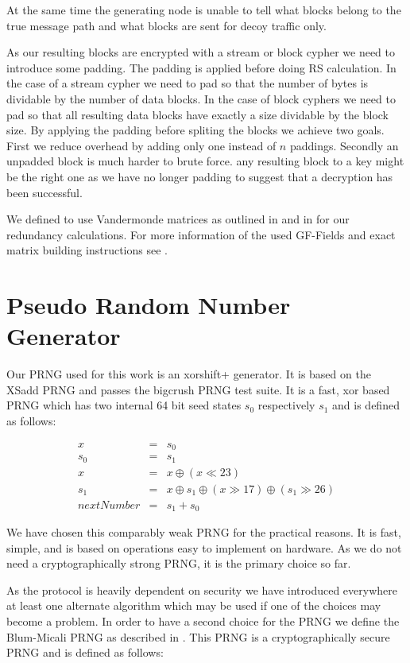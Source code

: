 \documentclass[9pt,journal,compsoc]{IEEEtran}
\begin{document}
At the same time the generating node is unable to tell what blocks belong to the true message path and what blocks are sent for decoy traffic only. 

As our resulting blocks are encrypted with a stream or block cypher we need to introduce some padding. The padding is applied before doing RS calculation. In the case of a stream cypher we need to pad so that the number of bytes is dividable by the number of data blocks. In the case of block cyphers we need to pad so that all resulting data blocks have exactly a size dividable by the block size. By applying the padding before spliting the blocks we achieve two goals. First we reduce overhead by adding only one instead of $n$ paddings. Secondly an unpadded block is much harder to brute force. any resulting block to a key might be the right one as we have no longer padding to suggest that a decryption has been successful.

We defined to use Vandermonde matrices as outlined in \cite{pd:96:rs} and in \cite{pd:03:rs} for our redundancy calculations. For more information of the used GF-Fields and exact matrix building instructions see \cite{messageVortex}.

\section{Pseudo Random Number Generator\label{sec:prng}}
Our PRNG used for this work is an xorshift+ generator. It is based on the XSadd PRNG\cite{marsaglia2003xorshift} and passes the bigcrush PRNG test suite. It is a fast, xor based PRNG which has two internal 64 bit seed states $s_0$ respectively $s_1$ and is defined as follows:

\begin{eqnarray}
x & = & s_0\\
s_0 & = & s_1\\
x & = & x \oplus ( x \ll 23 )\\
s_1 & = & x \oplus s_1 \oplus ( x \gg 17 ) \oplus (s_1 \gg 26 )\\
nextNumber & = & s_1+s_0
\end{eqnarray}

We have chosen this comparably weak PRNG for the practical reasons. It is fast, simple, and is based on operations easy to implement on hardware. As we do not need a cryptographically strong PRNG, it is the primary choice so far. 

As the protocol is heavily dependent on security we have introduced everywhere at least one alternate algorithm which may be used if one of the choices may become a problem. In order to have a second choice for the PRNG we define the Blum-Micali PRNG as described in \cite{blum1984generate}. This PRNG is a cryptographically secure PRNG and is defined as follows:
\end{document}
